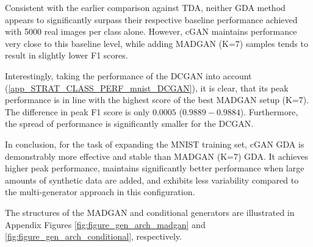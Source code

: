 Consistent with the earlier comparison against TDA, neither GDA method appears to significantly surpass their respective baseline performance achieved with 5000 real images per class alone. However, cGAN maintains performance very close to this baseline level, while adding MADGAN (K=7) samples tends to result in slightly lower F1 scores.

Interestingly, taking the performance of the DCGAN into account (\ref{app_STRAT_CLASS_PERF_mnist_DCGAN}), it is clear, that its peak performance is in line with the highest score of the best MADGAN setup (K=7). The difference in peak F1 score is only $0.0005$ ($0.9889 - 0.9884$). Furthermore, the spread of performance is significantly smaller for the DCGAN.

In conclusion, for the task of expanding the MNIST training set, cGAN GDA is demonstrably more effective and stable than MADGAN (K=7) GDA. It achieves higher peak performance, maintains significantly better performance when large amounts of synthetic data are added, and exhibits less variability compared to the multi-generator approach in this configuration.

The structures of the MADGAN and conditional generators are illustrated in Appendix Figures \ref{fig:figure_gen_arch_madgan} and \ref{fig:figure_gen_arch_conditional}, respectively.

